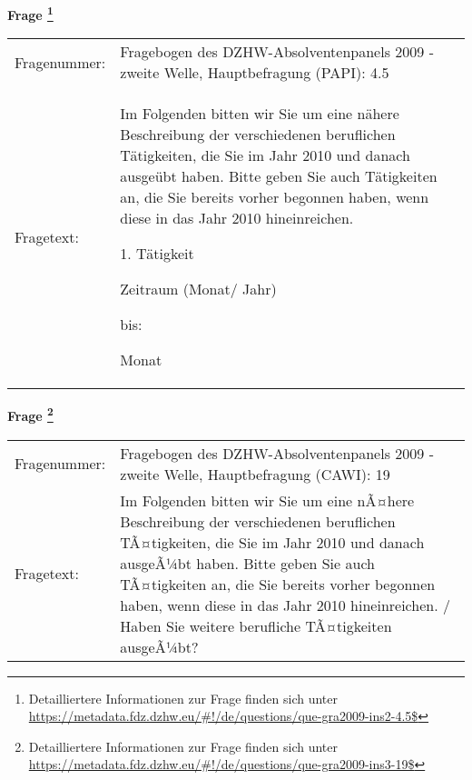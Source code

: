 				\vspace*{0.5cm}
                \noindent\textbf{Frage
	                \footnote{Detailliertere Informationen zur Frage finden sich unter
		              \url{https://metadata.fdz.dzhw.eu/\#!/de/questions/que-gra2009-ins2-4.5$}}}\\
				\begin{tabularx}{\hsize}{@{}lX}
					Fragenummer: &
					  Fragebogen des DZHW-Absolventenpanels 2009 - zweite Welle, Hauptbefragung (PAPI):
					  4.5
 \\
					Fragetext: & Im Folgenden bitten wir Sie um eine nähere Beschreibung der verschiedenen beruflichen Tätigkeiten, die Sie im Jahr 2010 und danach ausgeübt haben. Bitte geben Sie auch Tätigkeiten an, die Sie bereits vorher begonnen haben, wenn diese in das Jahr 2010 hineinreichen.\par  1. Tätigkeit\par  Zeitraum (Monat/ Jahr)\par  bis:\par  Monat \\
				\end{tabularx}
				\vspace*{0.5cm}
                \noindent\textbf{Frage
	                \footnote{Detailliertere Informationen zur Frage finden sich unter
		              \url{https://metadata.fdz.dzhw.eu/\#!/de/questions/que-gra2009-ins3-19$}}}\\
				\begin{tabularx}{\hsize}{@{}lX}
					Fragenummer: &
					  Fragebogen des DZHW-Absolventenpanels 2009 - zweite Welle, Hauptbefragung (CAWI):
					  19
 \\
					Fragetext: & Im Folgenden bitten wir Sie um eine nÃ¤here Beschreibung der verschiedenen beruflichen TÃ¤tigkeiten, die Sie im Jahr 2010 und danach ausgeÃ¼bt haben. Bitte geben Sie auch TÃ¤tigkeiten an, die Sie bereits vorher begonnen haben, wenn diese in das Jahr 2010 hineinreichen. / Haben Sie weitere berufliche TÃ¤tigkeiten ausgeÃ¼bt? \\
				\end{tabularx}





